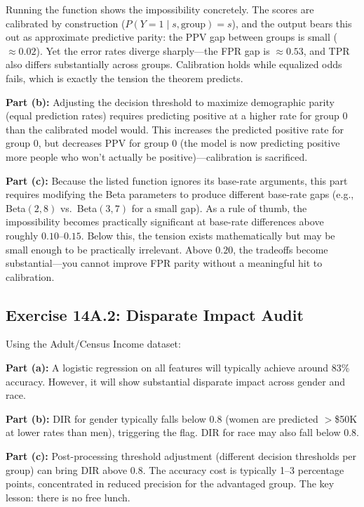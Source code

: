 Running the function shows the impossibility concretely. The scores are calibrated by construction ($P(Y{=}1 \mid s, \text{group}) = s$), and the output bears this out as approximate predictive parity: the PPV gap between groups is small ($\approx 0.02$). Yet the error rates diverge sharply---the FPR gap is $\approx 0.53$, and TPR also differs substantially across groups. Calibration holds while equalized odds fails, which is exactly the tension the theorem predicts.

\textbf{Part (b):} Adjusting the decision threshold to maximize demographic parity (equal prediction rates) requires predicting positive at a higher rate for group 0 than the calibrated model would. This increases the predicted positive rate for group 0, but decreases PPV for group 0 (the model is now predicting positive more people who won't actually be positive)---calibration is sacrificed.

\textbf{Part (c):} Because the listed function ignores its base-rate arguments, this part requires modifying the Beta parameters to produce different base-rate gaps (e.g., Beta$(2,8)$ vs.\ Beta$(3,7)$ for a small gap). As a rule of thumb, the impossibility becomes practically significant at base-rate differences above roughly $0.10$--$0.15$. Below this, the tension exists mathematically but may be small enough to be practically irrelevant. Above $0.20$, the tradeoffs become substantial---you cannot improve FPR parity without a meaningful hit to calibration.

\subsection*{Exercise 14A.2: Disparate Impact Audit}

Using the Adult/Census Income dataset:

\textbf{Part (a):} A logistic regression on all features will typically achieve around 83\% accuracy. However, it will show substantial disparate impact across gender and race.

\textbf{Part (b):} DIR for gender typically falls below 0.8 (women are predicted $>$\$50K at lower rates than men), triggering the flag. DIR for race may also fall below 0.8.

\textbf{Part (c):} Post-processing threshold adjustment (different decision thresholds per group) can bring DIR above 0.8. The accuracy cost is typically 1--3 percentage points, concentrated in reduced precision for the advantaged group. The key lesson: there is no free lunch.

